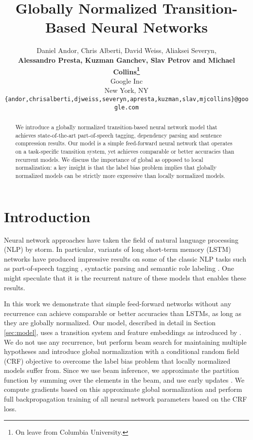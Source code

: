 \documentclass[11pt]{article}
\title{Globally Normalized Transition-Based Neural Networks}
\author{
  Daniel Andor, Chris Alberti, David Weiss, Aliaksei Severyn, \\
    {\bf Alessandro Presta, Kuzman Ganchev, Slav Petrov and Michael Collins\thanks{On leave from Columbia University.}}\\
  Google Inc\\
  New York, NY\\
  {\footnotesize \tt \{andor,chrisalberti,djweiss,severyn,apresta,kuzman,slav,mjcollins\}@google.com}
}
\date{}
\begin{document}
\maketitle

\begin{abstract}
We introduce a globally normalized transition-based neural network
model that achieves state-of-the-art part-of-speech tagging,
dependency parsing and sentence compression results.  Our model is a
simple feed-forward neural network that operates on a task-specific
transition system, yet achieves comparable or better accuracies than
recurrent models.
We discuss the importance of global as opposed to local normalization:
a key insight is that the label bias problem implies that
globally
normalized models can be strictly more expressive 
than locally normalized models.
\end{abstract}

\graphicspath{{./figs/}}
\newcommand{\bX}{\mathbf{X}}
\newcommand{\bE}{\mathbf{E}}
\newcommand{\bb}{\mathbf{b}}
\newcommand{\bH}{\mathbf{H}}
\newcommand{\bW}{\mathbf{W}}
\newcommand{\bh}{\mathbf{h}}
\newcommand{\mwords}{\mathrm{word}}
\newcommand{\mtags}{\mathrm{tag}}
\newcommand{\mlabels}{\mathrm{label}}
\newcommand{\todo}[1]{{\bf \color{red}{TODO: #1}}}
\newcommand{\eat}[1]{\ignorespaces}
\newcommand{\commentout}[1]{}
\newcommand\T{\rule{0pt}{4ex}}  

\section{Introduction}

Neural network approaches have taken the field of
natural language processing (NLP) by storm.
In particular, variants of long short-term memory (LSTM)
networks \cite{hochreiter1997} have produced impressive
results on some of the classic NLP tasks such as
part-of-speech tagging \cite{ling-EtAl:2015:EMNLP},
syntactic parsing \cite{grammarAsForeign} and
semantic role labeling \cite{zhou-xu:2015:ACL}.
One might speculate that it is the recurrent nature
of these models that enables these results.

In this work we demonstrate that simple feed-forward networks without
any recurrence can achieve comparable or better accuracies than LSTMs,
as long as they are globally normalized.  Our model, described in
detail in Section \ref{sec:model}, uses a transition system
\cite{Nivre:2006} and feature embeddings as introduced by
.  We do not use any recurrence, but
perform beam search for maintaining multiple hypotheses and introduce
global normalization with a conditional random field (CRF) objective
\cite{bottou-97,lecun-98h,crf,collobert2011natural}
to overcome the label bias problem that locally normalized models
suffer from.  Since we use beam inference, we approximate
the partition function by summing over the elements in the beam,
and use early updates
\cite{collins-roark:2004:ACL,zhou-etAl:2015:ACL}. We compute gradients
based on this approximate global normalization and perform full
backpropagation training of all neural network parameters based on the
CRF loss.
\end{document}

